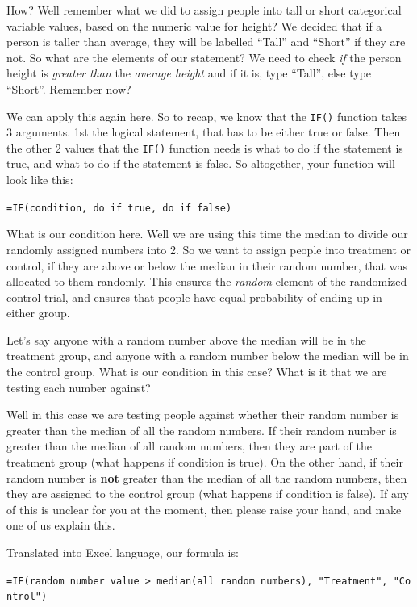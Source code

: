 \documentclass[
]{book}
\begin{document}
How? Well remember what we did to assign people into tall or short categorical variable values, based on the numeric value for height? We decided that if a person is taller than average, they will be labelled ``Tall'' and ``Short'' if they are not. So what are the elements of our statement? We need to check \emph{if} the person height is \emph{greater than} the \emph{average height} and if it is, type ``Tall'', else type ``Short''. Remember now?

We can apply this again here. So to recap, we know that the \texttt{IF()} function takes 3 arguments. 1st the logical statement, that has to be either true or false. Then the other 2 values that the \texttt{IF()} function needs is what to do if the statement is true, and what to do if the statement is false.
So altogether, your function will look like this:

\texttt{=IF(condition,\ do\ if\ true,\ do\ if\ false)}

What is our condition here. Well we are using this time the median to divide our randomly assigned numbers into 2. So we want to assign people into treatment or control, if they are above or below the median in their random number, that was allocated to them randomly. This ensures the \emph{random} element of the randomized control trial, and ensures that people have equal probability of ending up in either group.

Let's say anyone with a random number above the median will be in the treatment group, and anyone with a random number below the median will be in the control group. What is our condition in this case? What is it that we are testing each number against?

Well in this case we are testing people against whether their random number is greater than the median of all the random numbers. If their random number is greater than the median of all random numbers, then they are part of the treatment group (what happens if condition is true). On the other hand, if their random number is \textbf{not} greater than the median of all the random numbers, then they are assigned to the control group (what happens if condition is false). If any of this is unclear for you at the moment, then please raise your hand, and make one of us explain this.

Translated into Excel language, our formula is:

\texttt{=IF(random\ number\ value\ \textgreater{}\ median(all\ random\ numbers),\ "Treatment",\ "Control")}
\end{document}
